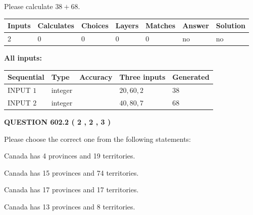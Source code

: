 \documentclass[12pt]{article}
\begin{document}
  
 
Please calculate $ %
38 +  %
68 $.
 
 
   
   
   
   
\noindent\begin{tabular}{|l|l|l|l|l|l|l|}
 \hline
Inputs & Calculates & Choices & Layers & Matches & Answer & Solution \\ \hline
 2  & 
 0  & 
 0
  & 
 0  & 
 0  & 
  no & 
  no 
  \\ \hline
 \end{tabular}
   
   
   
   
\noindent{}
   
   
   
   
\noindent\vspace{0.1in}\hspace{-0.08in} {\textbf{\Large{All inputs: }}}
   
   
  
  
\noindent\begin{tabular}{|l|l|l|l|l|}
\hline
 Sequential & Type & Accuracy & Three inputs & Generated \\ 
\hline
 
 
  INPUT $  1 $ & integer &  & $
 20
 , 
 60
 , 
 2
 $ & $ 38 $ 
 \\  \hline  
 
 
  INPUT $  2 $ & integer &  & $
 40
 , 
 80
 , 
 7
 $ & $ 68 $ 
 \\  \hline  
 \end{tabular}
   
   
  
\vspace{0.2in}
  
{\textbf{\Large{QUESTION
602.2 
 ( 2 , 2 , 3 )
}}}
  
  
Please choose the correct one from the following statements:
 
 
Canada has   4 provinces and  19 territories.
 
 
Canada has  15 provinces and  74 territories.
 
 
Canada has  17 provinces and  17 territories.
 
 
Canada has  13 provinces and  8 territories.
 
\end{document}
